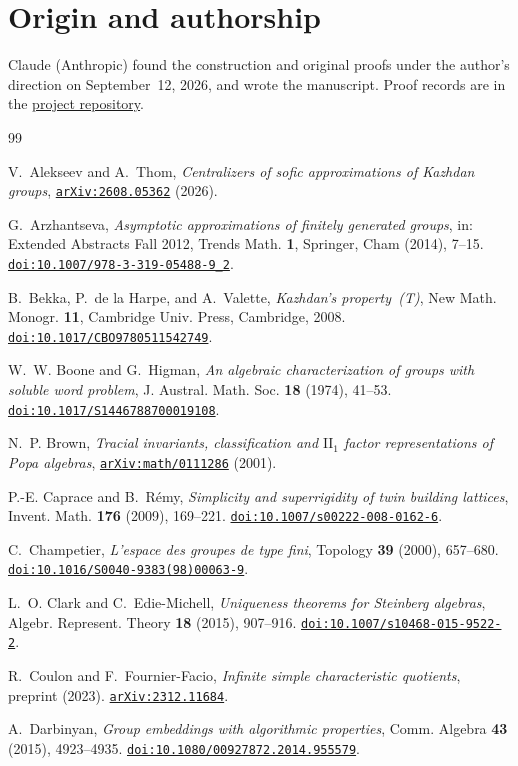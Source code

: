 \documentclass[11pt]{amsart}
\newcommand{\doi}[1]{\href{https://doi.org/#1}{\nolinkurl{doi:#1}}}
\newcommand{\arxiv}[1]{\href{https://arxiv.org/abs/#1}{\nolinkurl{arXiv:#1}}}
\begin{document}
\section*{Origin and authorship}
Claude (Anthropic) found the construction and original proofs under
the author's direction on September~12, 2026, and wrote the manuscript.
Proof records are
in the \href{https://github.com/SauersML/group-approximation}{project repository}.

\begin{thebibliography}{99}

V.~Alekseev and A.~Thom,
\emph{Centralizers of sofic approximations of Kazhdan groups},
\arxiv{2608.05362} (2026).

G.~Arzhantseva, \emph{Asymptotic approximations of finitely generated
groups}, in: Extended Abstracts Fall 2012, Trends Math. \textbf{1},
Springer, Cham (2014), 7--15. \doi{10.1007/978-3-319-05488-9_2}.

B.~Bekka, P.~de la Harpe, and A.~Valette, \emph{Kazhdan's
property~\textup{(T)}}, New Math. Monogr. \textbf{11}, Cambridge Univ.
Press, Cambridge, 2008. \doi{10.1017/CBO9780511542749}.

W.~W. Boone and G.~Higman, \emph{An algebraic characterization of groups
with soluble word problem}, J. Austral. Math. Soc. \textbf{18} (1974),
41--53. \doi{10.1017/S1446788700019108}.

N.~P. Brown, \emph{Tracial invariants, classification and
$\mathrm{II}_1$ factor representations of Popa algebras},
\arxiv{math/0111286} (2001).

P.-E. Caprace and B.~R\'emy, \emph{Simplicity and superrigidity of twin
building lattices}, Invent. Math. \textbf{176} (2009), 169--221.
\doi{10.1007/s00222-008-0162-6}.

C.~Champetier, \emph{L'espace des groupes de type fini}, Topology
\textbf{39} (2000), 657--680. \doi{10.1016/S0040-9383(98)00063-9}.

L.~O. Clark and C.~Edie-Michell, \emph{Uniqueness theorems for Steinberg
algebras}, Algebr. Represent. Theory \textbf{18} (2015), 907--916.
\doi{10.1007/s10468-015-9522-2}.

R.~Coulon and F.~Fournier-Facio, \emph{Infinite simple characteristic
quotients}, preprint (2023). \arxiv{2312.11684}.


A.~Darbinyan, \emph{Group embeddings with algorithmic properties}, Comm.
Algebra \textbf{43} (2015), 4923--4935.
\doi{10.1080/00927872.2014.955579}.


\end{thebibliography}
\end{document}
